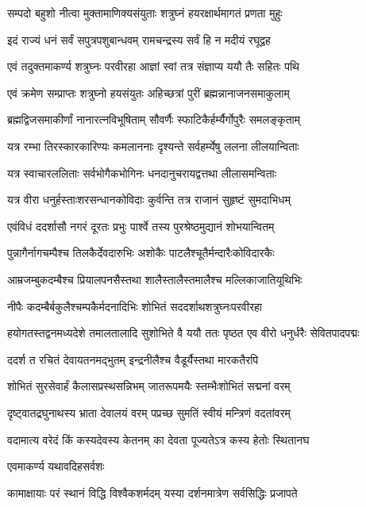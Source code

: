 \twolineshloka
{सम्पदो बहुशो नीत्वा मुक्तामाणिक्यसंयुताः}
{शत्रुघ्नं हयरक्षार्थमागतं प्रणता मुहुः}%

\twolineshloka
{इदं राज्यं धनं सर्वं सपुत्रपशुबान्धवम्}
{रामचन्द्रस्य सर्वं हि न मदीयं रघूद्वह}%

\twolineshloka
{एवं तदुक्तमाकर्ण्य शत्रुघ्नः परवीरहा}
{आज्ञां स्वां तत्र संज्ञाप्य ययौ तैः सहितः पथि}%

\twolineshloka
{एवं क्रमेण सम्प्राप्तः शत्रुघ्नो हयसंयुतः}
{अहिच्छत्रां पुरीं ब्रह्मन्नानाजनसमाकुलाम्}%

\twolineshloka
{ब्रह्मद्विजसमाकीर्णां नानारत्नविभूषिताम्}
{सौवर्णैः स्फाटिकैर्हर्म्यैर्गोपुरैः समलङ्कृताम्}%

\twolineshloka
{यत्र रम्भा तिरस्कारकारिण्यः कमलाननाः}
{दृश्यन्ते सर्वहर्म्येषु ललना लीलयान्विताः}%

\twolineshloka
{यत्र स्वाचारललिताः सर्वभोगैकभोगिनः}
{धनदानुचरायद्वत्तथा लीलासमन्विताः}%

\twolineshloka
{यत्र वीरा धनुर्हस्ताःशरसन्धानकोविदाः}
{कुर्वन्ति तत्र राजानं सुहृष्टं सुमदाभिधम्}%

\twolineshloka
{एवंविधं ददर्शासौ नगरं दूरतः प्रभुः}
{पार्श्वे तस्य पुरश्रेष्ठमुद्यानं शोभयान्वितम्}%

\twolineshloka
{पुन्नागैर्नागचम्पैश्च तिलकैर्देवदारुभिः}
{अशोकैः पाटलैश्चूतैर्मन्दारैःकोविदारकैः}%

\twolineshloka
{आम्रजम्बुकदम्बैश्च प्रियालपनसैस्तथा}
{शालैस्तालैस्तमालैश्च मल्लिकाजातियूथिभिः}%

\twolineshloka
{नीपैः कदम्बैर्बकुलैश्चम्पकैर्मदनादिभिः}
{शोभितं सददर्शाथशत्रुघ्नःपरवीरहा}%

\fourlineindentedshloka
{हयोगतस्तद्वनमध्यदेशे}
{तमालतालादि सुशोभिते वै}
{ययौ ततः पृष्ठत एव वीरो}
{धनुर्धरैः सेवितपादपद्मः}%

\twolineshloka
{ददर्श त रचितं देवायतनमद्भुतम्}
{इन्द्रनीलैश्च वैडूर्यैस्तथा मारकतैरपि}%

\twolineshloka
{शोभितं सुरसेवार्हं कैलासप्रस्थसन्निभम्}
{जातरूपमयैः स्तम्भैःशोभितं सद्मनां वरम्}%

\twolineshloka
{दृष्ट्वातद्रघुनाथस्य भ्राता देवालयं वरम्}
{पप्रच्छ सुमतिं स्वीयं मन्त्रिणं वदतांवरम्}%


\twolineshloka
{वदामात्य वरेदं किं कस्यदेवस्य केतनम्}
{का देवता पूज्यतेऽत्र कस्य हेतोः स्थितानघ}%

\onelineshloka
{एवमाकर्ण्य यथावदिहसर्वशः}%

\twolineshloka
{कामाक्षायाः परं स्थानं विद्धि विश्वैकशर्मदम्}
{यस्या दर्शनमात्रेण सर्वसिद्धिः प्रजापते}%

